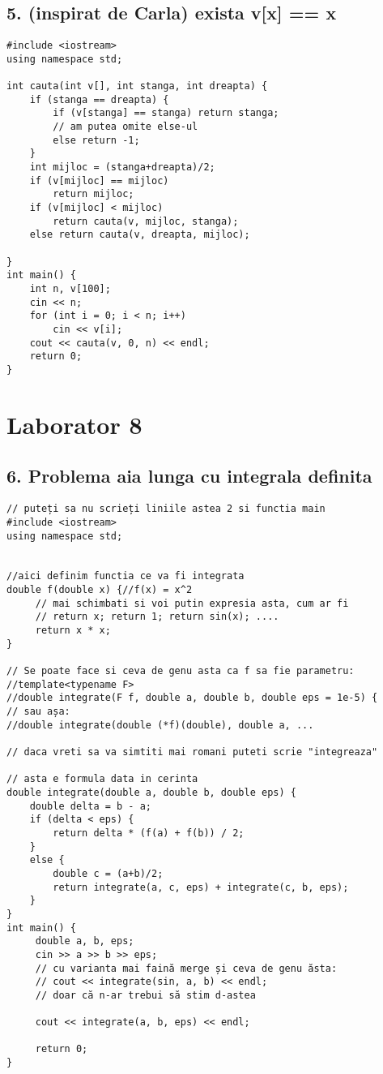 \documentclass[11pt]{article}
\begin{document}
\subsection*{5. (inspirat de Carla) exista v[x] == x}
\label{sec:orgc824136}
\begin{verbatim}
#include <iostream>
using namespace std;

int cauta(int v[], int stanga, int dreapta) {
    if (stanga == dreapta) {
        if (v[stanga] == stanga) return stanga;
        // am putea omite else-ul
        else return -1;
    }
    int mijloc = (stanga+dreapta)/2;
    if (v[mijloc] == mijloc) 
        return mijloc;
    if (v[mijloc] < mijloc) 
        return cauta(v, mijloc, stanga);
    else return cauta(v, dreapta, mijloc);

}
int main() {
    int n, v[100];
    cin << n;
    for (int i = 0; i < n; i++)
        cin << v[i];
    cout << cauta(v, 0, n) << endl;
    return 0;
}
\end{verbatim}
\pagebreak


\section*{Laborator 8}
\label{sec:org8863729}
\subsection*{6. Problema aia lunga cu integrala definita}
\label{sec:orgae69592}
\begin{verbatim}
// puteți sa nu scrieți liniile astea 2 si functia main
#include <iostream>
using namespace std;


//aici definim functia ce va fi integrata
double f(double x) {//f(x) = x^2
     // mai schimbati si voi putin expresia asta, cum ar fi 
     // return x; return 1; return sin(x); ....
     return x * x;
}

// Se poate face si ceva de genu asta ca f sa fie parametru:
//template<typename F>
//double integrate(F f, double a, double b, double eps = 1e-5) {
// sau așa:
//double integrate(double (*f)(double), double a, ...

// daca vreti sa va simtiti mai romani puteti scrie "integreaza"

// asta e formula data in cerinta
double integrate(double a, double b, double eps) {
    double delta = b - a;
    if (delta < eps) {
        return delta * (f(a) + f(b)) / 2;
    }
    else {
        double c = (a+b)/2;
        return integrate(a, c, eps) + integrate(c, b, eps);
    }
}
int main() {
     double a, b, eps;
     cin >> a >> b >> eps;
     // cu varianta mai faină merge și ceva de genu ăsta:
     // cout << integrate(sin, a, b) << endl;
     // doar că n-ar trebui să stim d-astea

     cout << integrate(a, b, eps) << endl;

     return 0;
}
\end{verbatim}
\pagebreak
\end{document}
